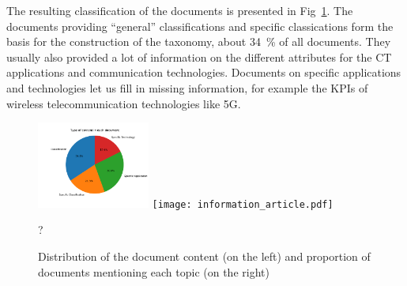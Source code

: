 The resulting classification of the documents is presented in Fig~\ref{fig:information_article}. The documents providing ``general'' classifications and specific classications form the basis for the construction of the taxonomy, about 34~\% of all documents. They usually also provided a lot of information on the different attributes for the \acrshort{CT} applications and communication technologies. Documents on specific applications and technologies let us fill in missing information,
for example the \acrshort{KPI}s of wireless telecommunication technologies like 5G.

\begin{figure}[ht!]
  \centering
  \includegraphics[width=0.33\textwidth]{pie_chart.pdf}
\hfill
  \texttt{[image: information\_article.pdf]}
\caption{Distribution of the document content (on the left) and proportion of documents mentioning each topic (on the right) }?
    \label{fig:information_article}
\end{figure}




